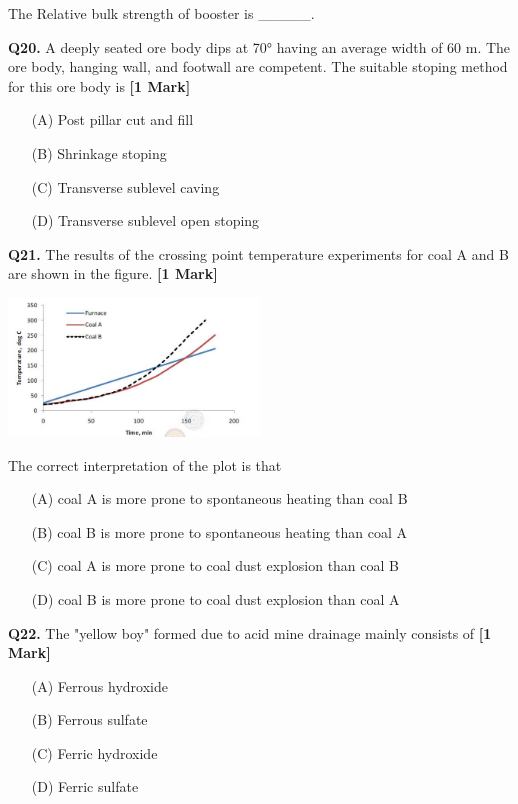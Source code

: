 \documentclass[11pt]{article}
\newcommand{\questiona}[2]{
    \noindent\textbf{Q#2.} #1 \hfill \textbf{[1 Mark]}
}
\begin{document}
The Relative bulk strength of booster is \_\_\_\_\_.
\vspace{0.5cm}

\questiona{A deeply seated ore body dips at 70° having an average width of 60 m. The ore body, hanging wall, and footwall are competent. The suitable stoping method for this ore body is}{20}
\begin{enumerate}
    \item[(A)] Post pillar cut and fill  
    \item[(B)] Shrinkage stoping  
    \item[(C)] Transverse sublevel caving  
    \item[(D)] Transverse sublevel open stoping  
\end{enumerate}
\vspace{0.5cm}

\questiona{The results of the crossing point temperature experiments for coal A and B are shown in the figure.}{21}

\begin{center}
\includegraphics[width=0.5\textwidth]{figures/21.png}
\end{center}

The correct interpretation of the plot is that
\begin{enumerate}
    \item[(A)] coal A is more prone to spontaneous heating than coal B  
    \item[(B)] coal B is more prone to spontaneous heating than coal A  
    \item[(C)] coal A is more prone to coal dust explosion than coal B  
    \item[(D)] coal B is more prone to coal dust explosion than coal A  
\end{enumerate}
\vspace{0.5cm}

\questiona{The "yellow boy" formed due to acid mine drainage mainly consists of}{22}
\begin{enumerate}
    \item[(A)] Ferrous hydroxide  
    \item[(B)] Ferrous sulfate  
    \item[(C)] Ferric hydroxide  
    \item[(D)] Ferric sulfate  
\end{enumerate}
\vspace{0.5cm}
\end{document}

